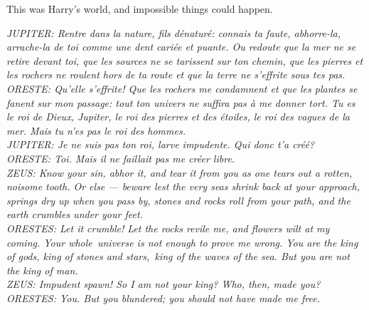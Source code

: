 This was Harry's world, and impossible things could happen.

\mybreak

\emph{JUPITER: Rentre dans la nature, fils dénaturé: connais ta faute,
abhorre-la, arrache-la de toi comme une dent cariée et puante. Ou
redoute que la mer ne se retire devant toi, que les sources ne se
tarissent sur ton chemin, que les pierres et les rochers ne roulent hors
de ta route et que la terre ne s'effrite sous tes pas.}\\
\emph{ORESTE: Qu'elle s'effrite! Que les rochers me condamnent et que
les plantes se fanent sur mon passage: tout ton univers ne suffira pas à
me donner tort. Tu es le roi de Dieux, Jupiter, le roi des pierres et
des étoiles, le roi des vagues de la mer. Mais tu n'es pas le roi des
hommes.}\\
\emph{JUPITER: Je ne suis pas ton roi, larve impudente. Qui donc t'a
créé?}\\
\emph{ORESTE: Toi. Mais il ne faillait pas me créer libre.}\\

\emph{ZEUS: Know your sin, abhor it, and tear it from you as one tears
out a rotten, noisome tooth. Or else --- beware lest the very seas
shrink back at your approach, springs dry up when you pass by, stones
and rocks roll from your path, and the earth crumbles under your
feet.}\\
\emph{ORESTES: Let it crumble! Let the rocks revile me, and flowers wilt
at my coming. Your whole~universe is not enough to prove me wrong. You
are the king of gods, king of stones and stars,~king of the waves of the
sea. But you are not the king of man.}\\
\emph{ZEUS: Impudent spawn! So I am not your king? Who, then, made
you?}\\
\emph{ORESTES: You. But you blundered; you should not have made me
free.}\\

